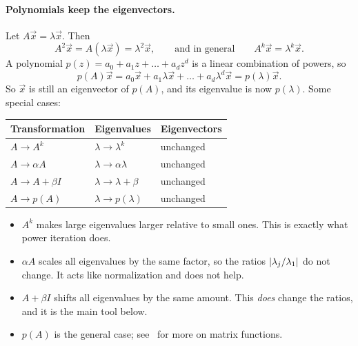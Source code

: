 \paragraph{Polynomials keep the eigenvectors.} Let $A\vec{x} = \lambda\vec{x}$. Then
\begin{equation*}
  A^2\vec{x} = A(\lambda\vec{x}) = \lambda^2\vec{x}, \qquad \text{and in general} \qquad A^k\vec{x} = \lambda^k\vec{x}.
\end{equation*}
A polynomial $p(z) = a_0 + a_1z + \dots + a_dz^d$ is a linear combination of powers, so
\begin{equation*}
  p(A)\vec{x} = a_0\vec{x} + a_1\lambda\vec{x} + \dots + a_d\lambda^d\vec{x} = p(\lambda)\vec{x}.
\end{equation*}
So $\vec{x}$ is still an eigenvector of $p(A)$, and its eigenvalue is now $p(\lambda)$. Some special cases:

\begin{center}
\begin{tabular}{lll}
  \toprule
  Transformation & Eigenvalues & Eigenvectors \\
  \midrule
  $A \to A^k$ & $\lambda \to \lambda^k$ & unchanged \\
  $A \to \alpha A$ & $\lambda \to \alpha\lambda$ & unchanged \\
  $A \to A + \beta I$ & $\lambda \to \lambda + \beta$ & unchanged \\
  $A \to p(A)$ & $\lambda \to p(\lambda)$ & unchanged \\
  \bottomrule
\end{tabular}
\end{center}

\begin{itemize}
  \item $A^k$ makes large eigenvalues larger relative to small ones. This is exactly what power iteration does.
  \item $\alpha A$ scales all eigenvalues by the same factor, so the ratios $\left\lvert \lambda_j/\lambda_1 \right\rvert$ do not change. It acts like normalization and does not help.
  \item $A + \beta I$ shifts all eigenvalues by the same amount. This \emph{does} change the ratios, and it is the main tool below.
  \item $p(A)$ is the general case; see~\cite{HighamFM} for more on matrix functions.
\end{itemize}


